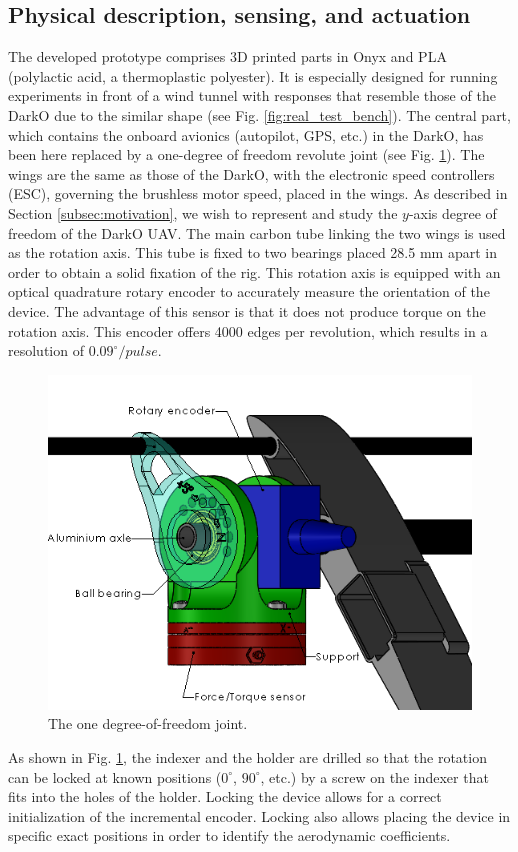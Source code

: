 \subsection{Physical description, sensing, and actuation}

The developed prototype comprises 3D printed parts in Onyx and PLA (polylactic acid, a thermoplastic polyester). It is especially designed for running experiments in front of a wind tunnel with responses that resemble those of the DarkO due to the similar shape (see Fig. \ref{fig:real_test_bench}). The central part, which contains the onboard avionics (autopilot, GPS, etc.) in the DarkO, has been here replaced by a one-degree of freedom revolute joint (see Fig. \ref{fig:rotation}). The wings are the same as those of the DarkO, with the electronic speed controllers (ESC), governing the brushless motor speed, placed in the wings. As described in Section \ref{subsec:motivation}, we wish to represent and study the $y$-axis degree of freedom of the DarkO UAV. The main carbon tube linking the two wings is used as the rotation axis. This tube is fixed to two bearings placed 28.5 mm apart in order to obtain a solid fixation of the rig. This rotation axis is equipped with an optical quadrature rotary encoder to accurately measure the orientation of the device. The advantage of this sensor is that it does not produce torque on the rotation axis. This encoder offers 4000 edges per revolution, which results in a resolution of $0.09^\circ/pulse$.

\begin{figure}[!ht]
    \centering
    \includegraphics[width=0.8\columnwidth]{figures/MontageSupport2.PNG}
    \caption{The one degree-of-freedom joint.}
    \label{fig:rotation}
\end{figure} 
As shown in Fig. \ref{fig:rotation}, the indexer and the holder are drilled so that the rotation can be locked at known positions ($0^\circ$, $90^\circ$, etc.) by a screw on the indexer that fits into the holes of the holder. Locking the device allows for a correct initialization of the incremental encoder. Locking also allows placing the device in specific exact positions in order to identify the aerodynamic coefficients. 

